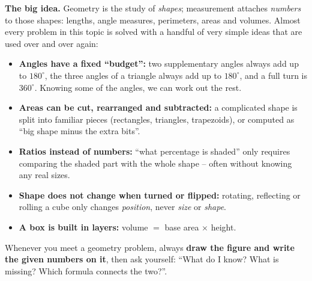 \ifdefined\gmFig\else
\newenvironment{gmFig}[1][]{\par\vspace{2pt}\begin{center}\begin{tikzpicture}[font=\sffamily\small,>=stealth,line join=round,#1]}%
  {\end{tikzpicture}\end{center}\vspace{1pt}}
\fi
\providecommand{\gmCube}[3]{%
  \begin{scope}[shift={(#1,0)},x=1.05cm,y=1.05cm]
    \fill[white] (0,0) rectangle (1,1);
    #3
    \draw[Ink,line width=0.8pt] (0,0) rectangle (1,1);
    \draw[Ink,line width=0.8pt] (0,1)--(0.4,1.25)--(1.4,1.25)--(1.4,0.25)--(1,0);
    \draw[Ink,line width=0.8pt] (1,1)--(1.4,1.25);
    \node[font=\small\bfseries,anchor=east] at (-0.05,1.1) {#2};
  \end{scope}}

\begin{knowbox}
\textbf{The big idea.} Geometry is the study of \emph{shapes}; measurement attaches \emph{numbers} to those shapes: lengths, angle measures, perimeters, areas and volumes. Almost every problem in this topic is solved with a handful of very simple ideas that are used over and over again:
\begin{itemize}[leftmargin=1.3em,itemsep=1pt,topsep=2pt]
  \item \textbf{Angles have a fixed ``budget'':} two supplementary angles always add up to $180^\circ$, the three angles of a triangle always add up to $180^\circ$, and a full turn is $360^\circ$. Knowing some of the angles, we can work out the rest.
  \item \textbf{Areas can be cut, rearranged and subtracted:} a complicated shape is split into familiar pieces (rectangles, triangles, trapezoids), or computed as ``big shape minus the extra bits''.
  \item \textbf{Ratios instead of numbers:} ``what percentage is shaded'' only requires comparing the shaded part with the whole shape -- often without knowing any real sizes.
  \item \textbf{Shape does not change when turned or flipped:} rotating, reflecting or rolling a cube only changes \emph{position}, never \emph{size} or \emph{shape}.
  \item \textbf{A box is built in layers:} volume $=$ base area $\times$ height.
\end{itemize}
Whenever you meet a geometry problem, always \textbf{draw the figure and write the given numbers on it}, then ask yourself: ``What do I know? What is missing? Which formula connects the two?''.
\end{knowbox}
\vspace{0.3cm}

